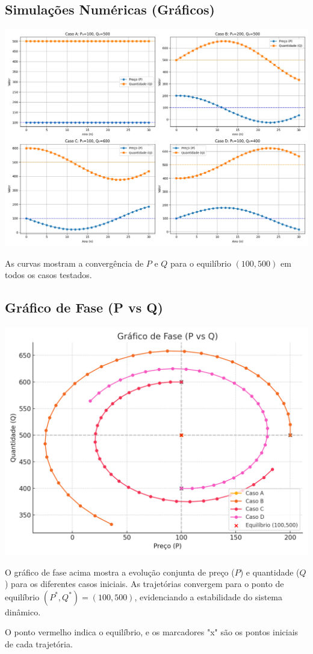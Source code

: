 \documentclass{article}
\begin{document}
\subsection*{Simulações Numéricas (Gráficos)}

\begin{center}
\includegraphics[width=0.9\linewidth]{simulacao.png}
\end{center}

As curvas mostram a convergência de $P$ e $Q$ para o equilíbrio $(100,500)$ em todos os casos testados.

\subsection*{Gráfico de Fase (P vs Q)}

\begin{center}
\includegraphics[width=0.7\linewidth]{fase.png}
\end{center}

O gráfico de fase acima mostra a evolução conjunta de preço ($P$) e quantidade ($Q$) para os diferentes casos iniciais.  
As trajetórias convergem para o ponto de equilíbrio $(P^*, Q^*) = (100, 500)$, evidenciando a estabilidade do sistema dinâmico.

O ponto vermelho indica o equilíbrio, e os marcadores "x" são os pontos iniciais de cada trajetória.
\end{document}
